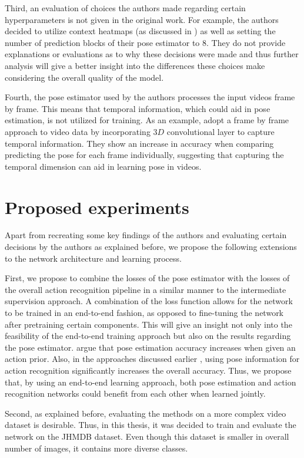 Third, an evaluation of choices the authors made regarding certain hyperparameters is not given in the original work.
For example, the authors decided to utilize context heatmaps (as discussed in ) as well as setting the number of prediction blocks of their pose estimator to $8$.
They do not provide explanations or evaluations as to why these decisions were made and thus further analysis will give a better insight into the differences these choices make considering the overall quality of the model.

Fourth, the pose estimator used by the authors processes the input videos frame by frame.
This means that temporal information, which could aid in pose estimation, is not utilized for training.
As an example, \cite{girdhar_detect-and-track:_2018} adopt a frame by frame approach to video data by incorporating $3D$ convolutional layer to capture temporal information.
They show an increase in accuracy when comparing predicting the pose for each frame individually, suggesting that capturing the temporal dimension can aid in learning pose in videos.

\section{Proposed experiments}
Apart from recreating some key findings of the authors and evaluating certain decisions by the authors as explained before, we propose the following extensions to the network architecture and learning process.

First, we propose to combine the losses of the pose estimator with the losses of the overall action recognition pipeline in a similar manner to the intermediate supervision approach.
A combination of the loss function allows for the network to be trained in an end-to-end fashion, as opposed to fine-tuning the network after pretraining certain components.
This will give an insight not only into the feasibility of the end-to-end training approach but also on the results regarding the pose estimator.
\cite{iqbal_pose_2016} argue that pose estimation accuracy increases when given an action prior.
Also, in the approaches discussed earlier , using pose information for action recognition significantly increases the overall accuracy.
Thus, we propose that, by using an end-to-end learning approach, both pose estimation and action recognition networks could benefit from each other when learned jointly.

Second, as explained before, evaluating the methods on a more complex video dataset is desirable.
Thus, in this thesis, it was decided to train and evaluate the network on the JHMDB dataset.
Even though this dataset is smaller in overall number of images, it contains more diverse classes.


